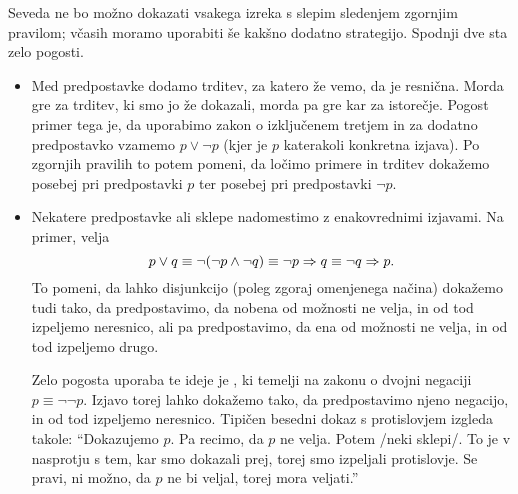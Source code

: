         Seveda ne bo možno dokazati vsakega izreka s slepim sledenjem zgornjim pravilom; včasih moramo uporabiti še kakšno dodatno strategijo. Spodnji dve sta zelo pogosti.
        \begin{itemize}
                \item
                        Med predpostavke dodamo trditev, za katero že vemo, da je resnična. Morda gre za trditev, ki smo jo že dokazali, morda pa gre kar za istorečje. Pogost primer tega je, da uporabimo zakon o izključenem tretjem in za dodatno predpostavko vzamemo $p \lor \lnot{p}$ (kjer je $p$ katerakoli konkretna izjava). Po zgornjih pravilih to potem pomeni, da ločimo primere in trditev dokažemo posebej pri predpostavki $p$ ter posebej pri predpostavki $\lnot{p}$.
                \item
                        Nekatere predpostavke ali sklepe nadomestimo z enakovrednimi izjavami. Na primer, velja
                        \[p \lor q \equiv \lnot(\lnot{p} \land \lnot{q}) \equiv \lnot{p} \Rightarrow q \equiv \lnot{q} \Rightarrow p.\]
                        To pomeni, da lahko disjunkcijo (poleg zgoraj omenjenega načina) dokažemo tudi tako, da predpostavimo, da nobena od možnosti ne velja, in od tod izpeljemo neresnico, ali pa predpostavimo, da ena od možnosti ne velja, in od tod izpeljemo drugo.

                        Zelo pogosta uporaba te ideje je , ki temelji na zakonu o dvojni negaciji $p \equiv \lnot\lnot{p}$. Izjavo torej lahko dokažemo tako, da predpostavimo njeno negacijo, in od tod izpeljemo neresnico. Tipičen besedni dokaz s protislovjem izgleda takole: ``Dokazujemo $p$. Pa recimo, da $p$ ne velja. Potem /neki sklepi/. To je v nasprotju s tem, kar smo dokazali prej, torej smo izpeljali protislovje. Se pravi, ni možno, da $p$ ne bi veljal, torej mora veljati.''
        \end{itemize}


